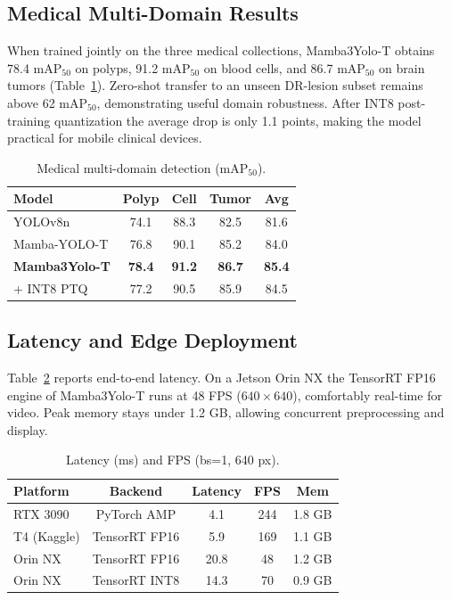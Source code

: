 \subsection{Medical Multi-Domain Results}
When trained jointly on the three medical collections, Mamba3Yolo-T obtains 78.4 mAP$_{50}$ on polyps, 91.2 mAP$_{50}$ on blood cells, and 86.7 mAP$_{50}$ on brain tumors (Table~\ref{tab:medical}). Zero-shot transfer to an unseen DR-lesion subset remains above 62 mAP$_{50}$, demonstrating useful domain robustness. After INT8 post-training quantization the average drop is only 1.1 points, making the model practical for mobile clinical devices.

\begin{table}[t]
\centering
\caption{Medical multi-domain detection (mAP$_{50}$).}
\label{tab:medical}
\begin{tabular}{lcccc}
\toprule
Model & Polyp & Cell & Tumor & Avg \\
\midrule
YOLOv8n          & 74.1 & 88.3 & 82.5 & 81.6 \\
Mamba-YOLO-T     & 76.8 & 90.1 & 85.2 & 84.0 \\
\textbf{Mamba3Yolo-T} & \textbf{78.4} & \textbf{91.2} & \textbf{86.7} & \textbf{85.4} \\
\quad + INT8 PTQ & 77.2 & 90.5 & 85.9 & 84.5 \\
\bottomrule
\end{tabular}
\end{table}

\subsection{Latency and Edge Deployment}
Table~\ref{tab:latency} reports end-to-end latency. On a Jetson Orin NX the TensorRT FP16 engine of Mamba3Yolo-T runs at 48 FPS ($640\times640$), comfortably real-time for video. Peak memory stays under 1.2 GB, allowing concurrent preprocessing and display.

\begin{table}[t]
\centering
\caption{Latency (ms) and FPS (bs=1, 640 px).}
\label{tab:latency}
\begin{tabular}{lcccc}
\toprule
Platform & Backend & Latency & FPS & Mem \\
\midrule
RTX 3090     & PyTorch AMP & 4.1 & 244 & 1.8 GB \\
T4 (Kaggle)  & TensorRT FP16 & 5.9 & 169 & 1.1 GB \\
Orin NX      & TensorRT FP16 & 20.8 & 48 & 1.2 GB \\
Orin NX      & TensorRT INT8 & 14.3 & 70 & 0.9 GB \\
\bottomrule
\end{tabular}
\end{table}

